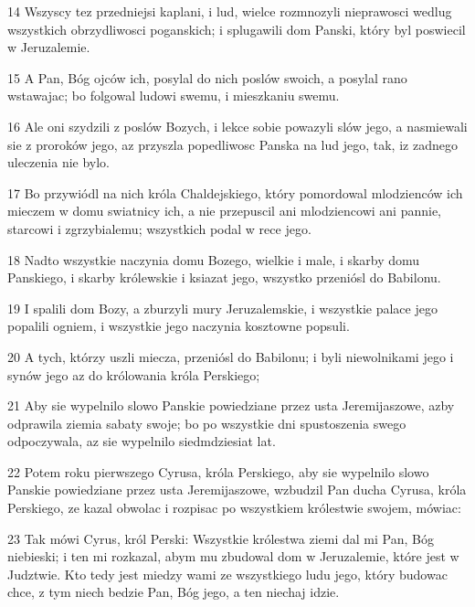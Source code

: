 \par 14 Wszyscy tez przedniejsi kaplani, i lud, wielce rozmnozyli nieprawosci wedlug wszystkich obrzydliwosci poganskich; i splugawili dom Panski, który byl poswiecil w Jeruzalemie.
\par 15 A Pan, Bóg ojców ich, posylal do nich poslów swoich, a posylal rano wstawajac; bo folgowal ludowi swemu, i mieszkaniu swemu.
\par 16 Ale oni szydzili z poslów Bozych, i lekce sobie powazyli slów jego, a nasmiewali sie z proroków jego, az przyszla popedliwosc Panska na lud jego, tak, iz zadnego uleczenia nie bylo.
\par 17 Bo przywiódl na nich króla Chaldejskiego, który pomordowal mlodzienców ich mieczem w domu swiatnicy ich, a nie przepuscil ani mlodziencowi ani pannie, starcowi i zgrzybialemu; wszystkich podal w rece jego.
\par 18 Nadto wszystkie naczynia domu Bozego, wielkie i male, i skarby domu Panskiego, i skarby królewskie i ksiazat jego, wszystko przeniósl do Babilonu.
\par 19 I spalili dom Bozy, a zburzyli mury Jeruzalemskie, i wszystkie palace jego popalili ogniem, i wszystkie jego naczynia kosztowne popsuli.
\par 20 A tych, którzy uszli miecza, przeniósl do Babilonu; i byli niewolnikami jego i synów jego az do królowania króla Perskiego;
\par 21 Aby sie wypelnilo slowo Panskie powiedziane przez usta Jeremijaszowe, azby odprawila ziemia sabaty swoje; bo po wszystkie dni spustoszenia swego odpoczywala, az sie wypelnilo siedmdziesiat lat.
\par 22 Potem roku pierwszego Cyrusa, króla Perskiego, aby sie wypelnilo slowo Panskie powiedziane przez usta Jeremijaszowe, wzbudzil Pan ducha Cyrusa, króla Perskiego, ze kazal obwolac i rozpisac po wszystkiem królestwie swojem, mówiac:
\par 23 Tak mówi Cyrus, król Perski: Wszystkie królestwa ziemi dal mi Pan, Bóg niebieski; i ten mi rozkazal, abym mu zbudowal dom w Jeruzalemie, które jest w Judztwie. Kto tedy jest miedzy wami ze wszystkiego ludu jego, który budowac chce, z tym niech bedzie Pan, Bóg jego, a ten niechaj idzie.


